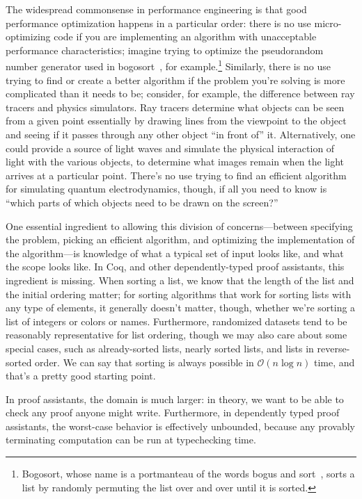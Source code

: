 The widespread commonsense in performance engineering %
is that good performance optimization happens in a particular order:
there is no use micro-optimizing code if you are implementing an algorithm with unacceptable performance characteristics; imagine trying to optimize the pseudorandom number generator used in bogosort~\cite{Sorting2007Gruber}, for example.\footnote{Bogosort, whose name is a portmanteau of the words bogus and sort~\cite{bogosort-name}, sorts a list by randomly permuting the list over and over until it is sorted.}
Similarly, there is no use trying to find or create a better algorithm if the problem you're solving is more complicated than it needs to be; consider, for example, the difference between ray tracers and physics simulators.
Ray tracers determine what objects can be seen from a given point essentially by drawing lines from the viewpoint to the object and seeing if it passes through any other object ``in front of'' it.
Alternatively, one could provide a source of light waves and simulate the physical interaction of light with the various objects, to determine what images remain when the light arrives at a particular point.
There's no use trying to find an efficient algorithm for simulating quantum electrodynamics, though, if all you need to know is ``which parts of which objects need to be drawn on the screen?''

One essential ingredient to allowing this division of concerns---between specifying the problem, picking an efficient algorithm, and optimizing the implementation of the algorithm---is knowledge of what a typical set of input looks like, and what the scope looks like.
In Coq, and other dependently-typed proof assistants, this ingredient is missing.
When sorting a list, we know that the length of the list and the initial ordering matter; for sorting algorithms that work for sorting lists with any type of elements, it generally doesn't matter, though, whether we're sorting a list of integers or colors or names.
Furthermore, randomized datasets tend to be reasonably representative for list ordering, though we may also care about some special cases, such as already-sorted lists, nearly sorted lists, and lists in reverse-sorted order.
We can say that sorting is always possible in $\mathcal O(n\log n)$ time, and that's a pretty good starting point.

In proof assistants, the domain is much larger: in theory, we want to be able to check any proof anyone might write.
Furthermore, in dependently typed proof assistants, the worst-case behavior is effectively unbounded, because any provably terminating computation can be run at typechecking time.

